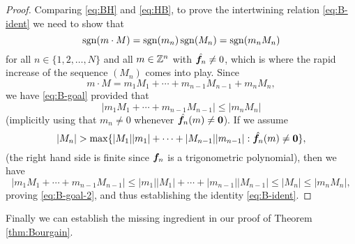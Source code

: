\begin{proof}
  Comparing \eqref{eq:BH} and \eqref{eq:HB}, to prove the intertwining relation \eqref{eq:B-ident} we need to show that
  \begin{equation}\label{eq:B-goal}
    \operatorname{sgn}(m \cdot M) = \operatorname{sgn}(m_n)\operatorname{sgn}(M_n) = \operatorname{sgn}(m_n M_n)
  \end{equation}
  for all $n \in \{1,2,\ldots,N\}$ and all $m \in \mathbb{Z}^{n}$ with $\hat{\bm{f}_{n}} \neq 0$, which is where the rapid increase of the sequence $(M_n)$ comes into play.
  Since
  \begin{equation*}
     m \cdot M = m_1 M_1 + \cdots + m_{n-1} M_{n-1} + m_n M_n,
  \end{equation*}
  we have \eqref{eq:B-goal}
  provided that
  \begin{equation}\label{eq:B-goal-2}
    | m_1 M_1 + \cdots + m_{n-1} M_{n-1} | \leq |m_n M_n|
  \end{equation}
  (implicitly using that $m_{n} \neq 0$ whenever $\hat{\bm{f}_n}(m) \neq \bm{0}$).
  If we assume
  \begin{equation*}
    |M_n| > \max \{ |M_1| |m_1| + \cdots + |M_{n-1}| |m_{n-1}| : \hat{\bm{f}_{n}}(m) \neq \bm{0}\},
  \end{equation*}
  (the right hand side is finite since $\bm{f}_n$ is a trigonometric polynomial), 
  then we have
  \begin{equation*}
    | m_1 M_1 + \cdots + m_{n-1} M_{n-1} | \leq |m_1| |M_1| + \cdots + |m_{n-1}| |M_{n-1}| \leq |M_n| \leq |m_n M_n|,
  \end{equation*}
  proving \eqref{eq:B-goal-2}, and thus establishing the identity \eqref{eq:B-ident}.
\end{proof}

Finally we can establish the missing ingredient in our proof of Theorem \ref{thm:Bourgain}.

